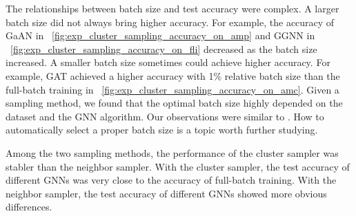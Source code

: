 The relationships between batch size and test accuracy were complex.
%
A larger batch size did not always bring higher accuracy.
%
For example, the accuracy of GaAN in \figurename~\ref{fig:exp_cluster_sampling_accuracy_on_amp} and GGNN in \figurename~\ref{fig:exp_cluster_sampling_accuracy_on_fli} decreased as the batch size increased.
%
A smaller batch size sometimes could achieve higher accuracy.
%
For example, GAT achieved a higher accuracy with 1\% relative batch size than the full-batch training in \figurename~\ref{fig:exp_cluster_sampling_accuracy_on_amc}.
%
Given a sampling method, we found that the optimal batch size highly depended on the dataset and the GNN algorithm.
%
Our observations were similar to \cite{zeng2020_graphsaint}.
%
How to automatically select a proper batch size is a topic worth further studying.

Among the two sampling methods, the performance of the cluster sampler was stabler than the neighbor sampler.
%
With the cluster sampler, the test accuracy of different GNNs was very close to the accuracy of full-batch training.
%
With the neighbor sampler, the test accuracy of different GNNs showed more obvious differences.

